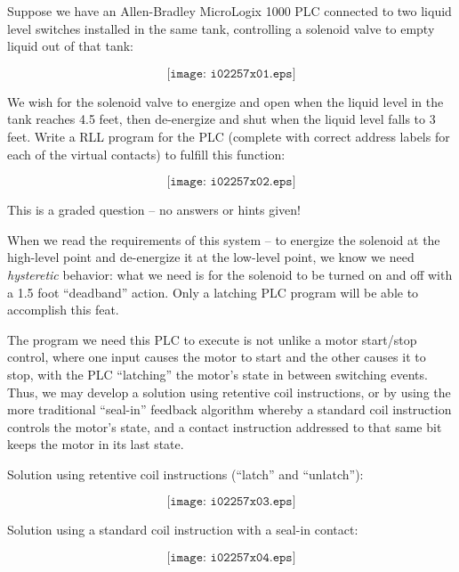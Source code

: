 

Suppose we have an Allen-Bradley MicroLogix 1000 PLC connected to two liquid level switches installed in the same tank, controlling a solenoid valve to empty liquid out of that tank:

$$\texttt{[image: i02257x01.eps]}$$

We wish for the solenoid valve to energize and open when the liquid level in the tank reaches 4.5 feet, then de-energize and shut when the liquid level falls to 3 feet.  Write a RLL program for the PLC (complete with correct address labels for each of the virtual contacts) to fulfill this function:

$$\texttt{[image: i02257x02.eps]}$$

\vfil

\eject






This is a graded question -- no answers or hints given!







When we read the requirements of this system -- to energize the solenoid at the high-level point and de-energize it at the low-level point, we know we need {\it hysteretic} behavior: what we need is for the solenoid to be turned on and off with a 1.5 foot ``deadband'' action.  Only a latching PLC program will be able to accomplish this feat.

The program we need this PLC to execute is not unlike a motor start/stop control, where one input causes the motor to start and the other causes it to stop, with the PLC ``latching'' the motor's state in between switching events.  Thus, we may develop a solution using retentive coil instructions, or by using the more traditional ``seal-in'' feedback algorithm whereby a standard coil instruction controls the motor's state, and a contact instruction addressed to that same bit keeps the motor in its last state.

\vskip 10pt

Solution using retentive coil instructions (``latch'' and ``unlatch''):

$$\texttt{[image: i02257x03.eps]}$$

\vskip 10pt

Solution using a standard coil instruction with a seal-in contact:

$$\texttt{[image: i02257x04.eps]}$$




